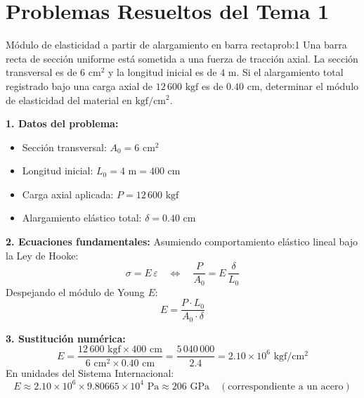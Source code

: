 \clearpage
\section{Problemas Resueltos del Tema 1}

\begin{question}{Módulo de elasticidad a partir de alargamiento en barra recta}{prob:1}
    Una barra recta de sección uniforme está sometida a una fuerza de tracción axial. La sección transversal es de $6\text{ cm}^2$ y la longitud inicial es de $4\text{ m}$. Si el alargamiento total registrado bajo una carga axial de $12\,600\text{ kgf}$ es de $0.40\text{ cm}$, determinar el módulo de elasticidad del material en $\text{kgf}/\text{cm}^2$.
\end{question}

\solve{}
\textbf{1. Datos del problema:}
\begin{itemize}
    \item Sección transversal: $A_0 = 6\text{ cm}^2$
    \item Longitud inicial: $L_0 = 4\text{ m} = 400\text{ cm}$
    \item Carga axial aplicada: $P = 12\,600\text{ kgf}$
    \item Alargamiento elástico total: $\delta = 0.40\text{ cm}$
\end{itemize}

\textbf{2. Ecuaciones fundamentales:}
Asumiendo comportamiento elástico lineal bajo la Ley de Hooke:
\begin{equation*}
    \sigma = E \, \varepsilon \quad \Longleftrightarrow \quad \frac{P}{A_0} = E \, \frac{\delta}{L_0}
\end{equation*}
Despejando el módulo de Young $E$:
\begin{equation*}
    E = \frac{P \cdot L_0}{A_0 \cdot \delta}
\end{equation*}

\textbf{3. Sustitución numérica:}
\begin{equation*}
    E = \frac{12\,600\text{ kgf} \times 400\text{ cm}}{6\text{ cm}^2 \times 0.40\text{ cm}} = \frac{5\,040\,000}{2.4} = 2.10 \times 10^6\text{ kgf}/\text{cm}^2
\end{equation*}
En unidades del Sistema Internacional:
\begin{equation*}
    E \approx 2.10 \times 10^6 \times 9.80665 \times 10^4\text{ Pa} \approx 206\text{ GPa} \quad (\text{correspondiente a un acero})
\end{equation*}


